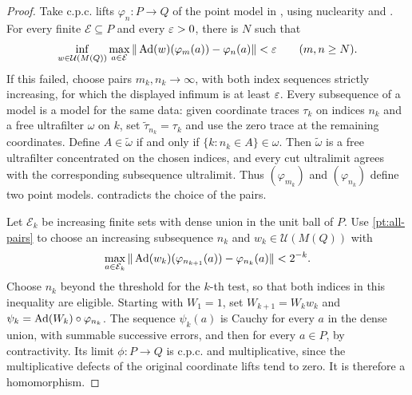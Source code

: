 \begin{proof}
Take c.p.c. lifts \(\varphi_n:P\to Q\) of the point
model in , using nuclearity and
\cite[Theorem~3.10]{ChoiEffrosLifting}.
For every finite \(\mathcal E\subseteq P\) and every
\(\varepsilon>0\), there is \(N\) such that
\begin{equation}\label{pt:all-pairs}
 \inf_{w\in\mathcal U(M(Q))}
 \max_{a\in\mathcal E}
 \|\operatorname{Ad}(w)(\varphi_m(a))-\varphi_n(a)\|<\varepsilon
 \qquad(m,n\geq N).
\end{equation}
If this failed, choose pairs \(m_k,n_k\to\infty\),
with both index sequences strictly increasing,
for which the displayed infimum is at least \(\varepsilon\).
Every subsequence of a model is a model for the same
data: given coordinate traces $\tau_k$ on indices $n_k$ and a free
ultrafilter $\omega$ on $k$, set $\widetilde\tau_{n_k}=\tau_k$
and use the zero trace at the remaining coordinates. Define
$A\in\widetilde\omega$ if and only if
$\{k:n_k\in A\}\in\omega$. Then $\widetilde\omega$ is a free
ultrafilter concentrated on the chosen indices, and every cut
ultralimit agrees with the corresponding subsequence ultralimit.  Thus \((\varphi_{m_k})\) and
\((\varphi_{n_k})\) define two point models.
 contradicts the choice of the pairs.

Let \(\mathcal E_k\) be increasing finite sets with dense
union in the unit ball of \(P\).
Use \eqref{pt:all-pairs} to choose an increasing
subsequence \(n_k\) and \(w_k\in\mathcal U(M(Q))\) with
\[
 \max_{a\in\mathcal E_k}
 \|\operatorname{Ad}(w_k)(\varphi_{n_{k+1}}(a))
                -\varphi_{n_k}(a)\|<2^{-k}.
\]
Choose \(n_k\) beyond the threshold for the \(k\)-th
test, so that both indices in this inequality are
eligible.  Starting with \(W_1=1\), set
\(W_{k+1}=W_k w_k\) and
\(\psi_k=\operatorname{Ad}(W_k)\circ\varphi_{n_k}\).
The sequence \(\psi_k(a)\) is Cauchy for every \(a\)
in the dense union, with summable successive errors,
and then for every \(a\in P\), by contractivity.
Its limit \(\phi:P\to Q\) is c.p.c. and multiplicative,
since the multiplicative defects of the original
coordinate lifts tend to zero.  It is therefore a
homomorphism.


\end{proof}
